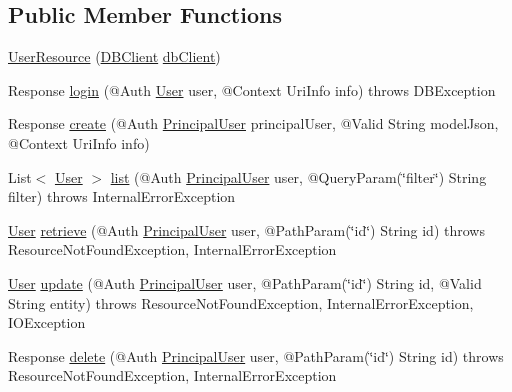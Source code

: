 \subsection*{Public Member Functions}
\begin{DoxyCompactItemize}
\item 
\hyperlink{classedu_1_1sjsu_1_1amigo_1_1user_1_1rest_1_1_user_resource_af5ac3f081392836c08d6744c123fd58f}{User\+Resource} (\hyperlink{interfaceedu_1_1sjsu_1_1amigo_1_1db_1_1common_1_1_d_b_client}{D\+B\+Client} \hyperlink{classedu_1_1sjsu_1_1amigo_1_1user_1_1rest_1_1_base_resource_a5f2d4befed6cbdcf6f0d9f4757875db5}{db\+Client})
\item 
Response \hyperlink{classedu_1_1sjsu_1_1amigo_1_1user_1_1rest_1_1_user_resource_af9c68d9343542ae9c68cb6d98c8d1659}{login} (@Auth \hyperlink{classedu_1_1sjsu_1_1amigo_1_1user_1_1db_1_1model_1_1_user}{User} user, @Context Uri\+Info info)  throws D\+B\+Exception 
\item 
Response \hyperlink{classedu_1_1sjsu_1_1amigo_1_1user_1_1rest_1_1_user_resource_ae1ace2fa3471a65e8e1643206c14c898}{create} (@Auth \hyperlink{classedu_1_1sjsu_1_1amigo_1_1user_1_1auth_1_1_principal_user}{Principal\+User} principal\+User, @Valid String model\+Json, @Context Uri\+Info info)
\item 
List$<$ \hyperlink{classedu_1_1sjsu_1_1amigo_1_1user_1_1db_1_1model_1_1_user}{User} $>$ \hyperlink{classedu_1_1sjsu_1_1amigo_1_1user_1_1rest_1_1_user_resource_a37d0c5cd46db2da2d2d73c5eb759cbd2}{list} (@Auth \hyperlink{classedu_1_1sjsu_1_1amigo_1_1user_1_1auth_1_1_principal_user}{Principal\+User} user, @Query\+Param(\char`\"{}filter\char`\"{}) String filter)  throws Internal\+Error\+Exception 
\item 
\hyperlink{classedu_1_1sjsu_1_1amigo_1_1user_1_1db_1_1model_1_1_user}{User} \hyperlink{classedu_1_1sjsu_1_1amigo_1_1user_1_1rest_1_1_user_resource_a3cddee66220e2775dc30c2e0c2879f83}{retrieve} (@Auth \hyperlink{classedu_1_1sjsu_1_1amigo_1_1user_1_1auth_1_1_principal_user}{Principal\+User} user, @Path\+Param(\char`\"{}id\char`\"{}) String id)  throws Resource\+Not\+Found\+Exception, Internal\+Error\+Exception 
\item 
\hyperlink{classedu_1_1sjsu_1_1amigo_1_1user_1_1db_1_1model_1_1_user}{User} \hyperlink{classedu_1_1sjsu_1_1amigo_1_1user_1_1rest_1_1_user_resource_a7d7c61de39c219479906b4f274882ddb}{update} (@Auth \hyperlink{classedu_1_1sjsu_1_1amigo_1_1user_1_1auth_1_1_principal_user}{Principal\+User} user, @Path\+Param(\char`\"{}id\char`\"{}) String id, @Valid String entity)  throws Resource\+Not\+Found\+Exception, Internal\+Error\+Exception, I\+O\+Exception 
\item 
Response \hyperlink{classedu_1_1sjsu_1_1amigo_1_1user_1_1rest_1_1_user_resource_ad45f52ff2d2a33b2cae1b9ef4f7a3649}{delete} (@Auth \hyperlink{classedu_1_1sjsu_1_1amigo_1_1user_1_1auth_1_1_principal_user}{Principal\+User} user, @Path\+Param(\char`\"{}id\char`\"{}) String id)  throws Resource\+Not\+Found\+Exception, Internal\+Error\+Exception 
\end{DoxyCompactItemize}
